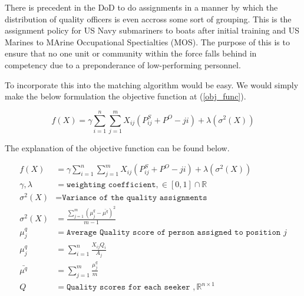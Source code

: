 There is precedent in the DoD to do assignments in a manner by which the distribution of quality officers is even accross some sort of grouping. This is the assignment policy for US Navy submariners to boats after initial training and US Marines to MArine Occupational Spectialties (MOS). The purpose of this is to ensure that no one unit or community within the force falls behind in competency due to a preponderance of low-performing personnel. 

To incorporate this into the matching algorithm would be easy. We would simply make the below formulation the objective function at (\ref{obj_func}).

\[ f(X) = \gamma \sum_{i=1}^n \sum_{j=1}^m X_{ij} \left(P^S_{ij} + P^O-{ji}\right) + \lambda (\sigma^2(X)) \]

The explanation of the objective function can be found below.

\begin{align*}
f(X) &= \gamma \sum_{i=1}^n \sum_{j=1}^m X_{ij} \left(P^S_{ij} + P^O-{ji}\right) + \lambda (\sigma^2(X)) \\
    \gamma, \lambda &= \texttt{weighting coefficient}, \in [0,1] \cap \mathbb{R} \\
    \sigma^2(X) &= \texttt{Variance of the quality assignments} \\
    \sigma^2(X) &= \frac{\sum_{j=1}^m (\mu^q_j - \bar{\mu^q})^2}{m-1} \\
    \mu^q_j &= \texttt{Average Quality score of person assigned to position } j \\
    \mu^q_j &= \sum_{i=1}^n  \frac{X_{ij} Q_i}{A_j} \\
    \bar{\mu^q} &= \sum_{j=1}^m \frac{\mu^q_j}{m} \\
    Q &= \texttt{Quality scores for each seeker }, \mathbb{R}^{n \times 1}
\end{align*}
